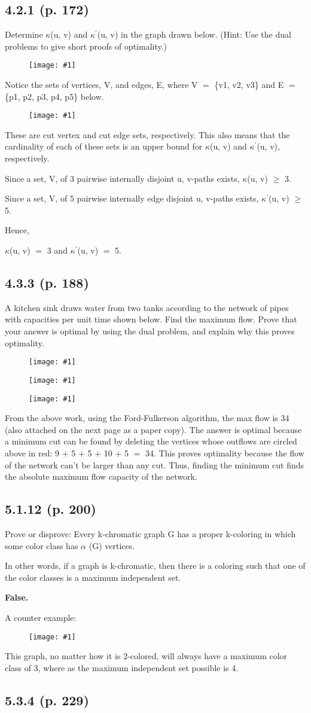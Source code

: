 \documentclass{article}
\newcommand{\mt}[1]{\ensuremath{#1}}
\newcommand\ssc[2][\DefaultOpt]{%
  \def\DefaultOpt{#2}%
  \subsection[#1]{#2}%
}
\newcommand{\afa}{\mt{\alpha} }
\newcommand{\bk}[1]{\{#1\}}
\newcommand{\ps}{\mt{\operatorname{+}} }
\newcommand{\gre}{\mt{\operatorname{\geq}} }
\newcommand{\eql}{ \mt{\operatorname{=}} }
\newcommand{\pr}{\mt{^\prime} } 		   %
\newcommand{\img}[1]{
\begin{figure}[h]
  \texttt{[image: \#1]}
\end{figure}
}
\newcommand{\simg}[1]{
\begin{figure}[h]
  \texttt{[image: \#1]}
\end{figure}
}
\begin{document}
\newpage

\ssc{4.2.1 (p. 172)}{

Determine $\kappa$(u, v) and $\kappa\pr$(u, v) in the graph drawn below. (Hint: Use the dual problems to give short proofs of optimality.)

\img{GTHW5421}

Notice the sets of vertices, V, and edges, E, where V \eql \bk{v1, v2, v3} and E \eql \bk{p1, p2, p3, p4, p5} below.

\img{GTHW54212}

These are cut vertex and cut edge sets, respectively. This also means that the cardinality of each of these sets is an upper bound for $\kappa$(u, v) and $\kappa\pr$(u, v), respectively.

Since a set, V, of 3 pairwise internally disjoint u, v-paths exists, $\kappa$(u, v) \gre 3.

Since a set, V, of 5 pairwise internally edge disjoint u, v-paths exists, $\kappa\pr$(u, v) \gre 5.

Hence,

$\kappa$(u, v) \eql 3 and $\kappa\pr$(u, v) \eql 5.

}

\newpage

\ssc{4.3.3 (p. 188)}{

A kitchen sink draws water from two tanks according to the network of pipes with capacities per unit time shown below. Find the maximum flow. Prove that your answer is optimal by using the dual problem, and explain why this proves optimality.

\simg{GTHW5433}

\img{GTHW54332}

\simg{GTHW54333}


From the above work, using the Ford-Fulkerson algorithm, the max flow is 34 (also attached on the next page as a paper copy). The answer is optimal because a minimum cut can be found by deleting the vertices whose outflows are circled above in red: 9 \ps 5 \ps 5 \ps 10 \ps 5 \eql 34. This proves optimality because the flow of the network can't be larger than any cut. Thus, finding the minimum cut finds the absolute maximum flow capacity of the network.

}

\newpage

\ssc{5.1.12 (p. 200)}{

Prove or disprove: Every k-chromatic graph G has a proper k-coloring in which some color class has \afa(G) vertices.

In other words, if a graph is k-chromatic, then there is a coloring such that one of the color classes is a maximum independent set.

\textbf{False.}

A counter example:

\img{GTHW55121}

This graph, no matter how it is 2-colored, will always have a maximum color class of 3, where as the maximum independent set possible is 4.
}

\ssc{5.3.4 (p. 229)}{



}
\end{document}

